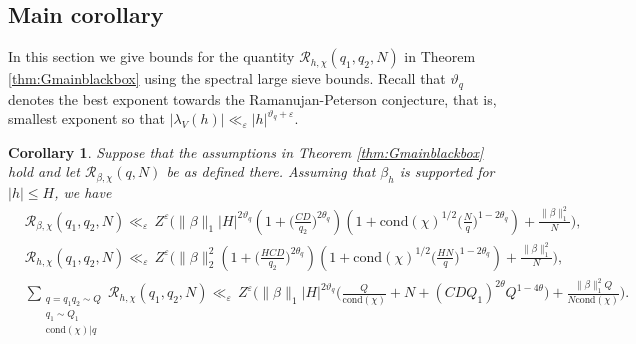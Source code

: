 \documentclass[12pt]{amsart}
\newtheorem{corollary}[theorem]{Corollary}
\theoremstyle{definition}
\theoremstyle{remark}
\numberwithin{equation}{section}
\newcommand{\1}{{\mathbf 1}}
\newcommand{\eps}{\varepsilon}
\begin{document}
\subsection{Main corollary}
In this section  we give bounds for the quantity $\mathcal{R}_{h,\chi}(q_1,q_2,N)$ in Theorem \ref{thm:Gmainblackbox}  using the spectral large sieve bounds. Recall that $\vartheta_q$ denotes the best exponent towards the Ramanujan-Peterson conjecture, that is,  smallest exponent so that $|\lambda_V(h)| \ll_\eps |h|^{\vartheta_q +\eps}$.  
\begin{corollary} \label{cor:Gmainblackbox}
Suppose that the assumptions in Theorem \ref{thm:Gmainblackbox} hold and let $ \mathcal{R}_{\beta,\chi}(q,N)$ be as defined there.
Assuming that $\beta_h$ is supported for $|h| \leq H$, we have
\begin{align*}
 & \mathcal{R}_{\beta,\chi}(q_1,q_2,N) \ll_\eps  \,  Z^\eps \bigg(\|\beta\|_1|H|^{2\vartheta_q}  \left(1+\bigg(\frac{CD}{q_2}\bigg)^{2\theta_q} \right)\left(1+ \mathrm{cond}(\chi)^{1/2}\bigg(\frac{N}{q}\bigg)^{1-2\theta_q}\right)  +\frac{\|\beta\|_1^2}{ N} \bigg), \\
   & \mathcal{R}_{h,\chi}(q_1,q_2,N) \ll_\eps  \,   Z^\eps \bigg(\|\beta\|_2^2 \left(1+\bigg(\frac{ H CD}{q_2}\bigg)^{2\theta_q} \right)\left(1+ \mathrm{cond}(\chi)^{1/2}\bigg(\frac{H N}{q}\bigg)^{1-2\theta_q}\right)   +\frac{\|\beta\|_1^2}{ N}\bigg), \\
 &\sum_{\substack{q=q_1q_2 \sim Q \\ q_1 \sim Q_1 \\ \mathrm{cond}(\chi) | q}}  \mathcal{R}_{h,\chi}(q_1,q_2,N) \ll_\eps  \,  Z^\eps \bigg(\|\beta\|_1|H|^{2\vartheta_q}   \bigg(\frac{Q} {\mathrm{cond}(\chi)}  + N + (CD Q_1 )^{2\theta} Q^{1-4\theta}\bigg) +     \frac{\|\beta\|_1^2 Q} { N\mathrm{cond}(\chi)} \bigg).
\end{align*}
\end{corollary}
\end{document}
